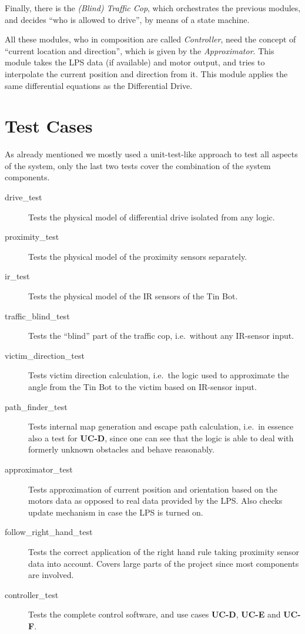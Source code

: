 \documentclass[a4paper,parskip,headheight=38pt]{scrartcl} %
\begin{document}
Finally, there is the \emph{(Blind) Traffic Cop}, which orchestrates the previous modules, and decides \enquote{who is allowed to drive}, by means of a state machine.

All these modules, who in composition are called \emph{Controller}, need the concept of \enquote{current location and direction}, which is given by the \emph{Approximator}. This module takes the LPS data (if available) and motor output, and tries to interpolate the current position and direction from it. This module applies the same differential equations as the Differential Drive.

\section{Test Cases}
As already mentioned we mostly used a unit-test-like approach to test all aspects of the system, only the last two tests cover the combination of the system components.

\begin{description}
\item[drive\_test] Tests the physical model of differential drive isolated from any logic.
\item[proximity\_test] Tests the physical model of the proximity sensors separately. %
\item[ir\_test] Tests the physical model of the IR sensors of the Tin Bot.
\item[traffic\_blind\_test] Tests the \enquote{blind} part of the traffic cop, i.e.\ without any IR-sensor input.
\item[victim\_direction\_test] Tests victim direction calculation, i.e.\ the logic used to approximate the angle from the Tin Bot to the victim based on IR-sensor input.
\item[path\_finder\_test] Tests internal map generation and escape path calculation, i.e.\ in essence also a test for \textbf{UC-D}, since one can see that the logic is able to deal with formerly unknown obstacles and behave reasonably.
\item[approximator\_test] Tests approximation of current position and orientation based on the motors data as opposed to real data provided by the LPS. Also checks update mechanism in case the LPS is turned on.
\item[follow\_right\_hand\_test] Tests the correct application of the right hand rule taking proximity sensor data into account. Covers large parts of the project since most components are involved.
\item[controller\_test] Tests the complete control software, and use cases \textbf{UC-D}, \textbf{UC-E} and \textbf{UC-F}.
\end{description}
\end{document}
